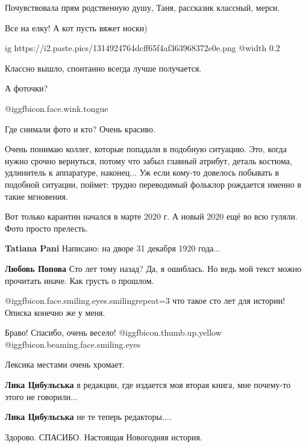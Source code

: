 \begin{itemize}
Почувствовала прям родственную душу, Таня, рассказик классный, мерси.

Все на елку! А кот пусть вяжет носки)

\ifcmt
  ig https://i2.paste.pics/1314924764dcff65f4af363968372e0e.png
  @width 0.2
\fi

Классно вышло, спонтанно всегда лучше получается.

А фоточки?


 @igg{fbicon.face.wink.tongue} 

Где снимали фото и кто? Очень красиво.


Очень понимаю коллег, которые попадали в подобную ситуацию. Это, когда нужно
срочно вернуться, потому что забыл главный атрибут, деталь костюма, удлинитель
к аппаратуре, наконец... Уж если кому-то довелось побывать в подобной ситуации,
поймет: трудно переводимый фольклор рождается именно в такие мгновения.



Вот только карантин начался в марте 2020 г. А новый 2020 ещё во всю гуляли.
Фото просто прелесть.

\begin{itemize} %
\textbf{Tatiana Pani} Написано: на дворе 31 декабря 1920 года...

\textbf{Любовь Попова} Сто лет тому назад?
Да, я ошиблась.
Но ведь мой текст можно прочитать иначе. Как грусть о прошлом.

 @igg{fbicon.face.smiling.eyes.smiling}{repeat=3}  что такое сто лет для истории!
Описка конечно же у меня.
\end{itemize} %

Браво! Спасибо, очень весело!  @igg{fbicon.thumb.up.yellow}  @igg{fbicon.beaming.face.smiling.eyes} 

Лексика местами очень хромает.

\textbf{Лика Цибульська} в редакции, где издается моя вторая книга, мне почему-то этого не говорили...

\textbf{Лика Цибульська} не те теперь редакторы....

Здорово. СПАСИБО. Настоящая Новогодняя история.


\end{itemize}
